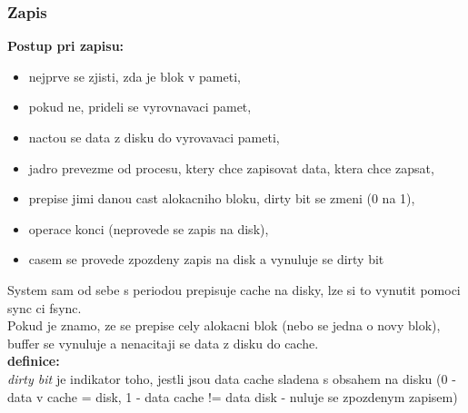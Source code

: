 \documentclass[a4paper, 11pt]{article}
\begin{document}
\subsubsection{Zapis}

\textbf{Postup pri zapisu:}
\begin{itemize}
    \item nejprve se zjisti, zda je blok v pameti,
    \item pokud ne, prideli se vyrovnavaci pamet,
    \item nactou se data z disku do vyrovavaci pameti,
    \item jadro prevezme od procesu, ktery chce zapisovat data, ktera chce zapsat,
    \item prepise jimi danou cast alokacniho bloku, dirty bit se zmeni (0 na 1),
    \item operace konci (neprovede se zapis na disk),
    \item casem se provede zpozdeny zapis na disk a vynuluje se dirty bit \\
\end{itemize}

System sam od sebe s periodou prepisuje cache na disky, lze si to vynutit pomoci sync ci fsync. \\

Pokud je znamo, ze se prepise cely alokacni blok (nebo se jedna o novy blok), buffer se vynuluje a nenacitaji se data z disku do cache. \\


\textbf{definice:} \\[0.5em]
\textit{dirty bit} je indikator toho, jestli jsou data cache sladena s obsahem na disku (0 - data v cache = disk, 1 - data cache != data disk - nuluje se zpozdenym zapisem) \\
\end{document}

